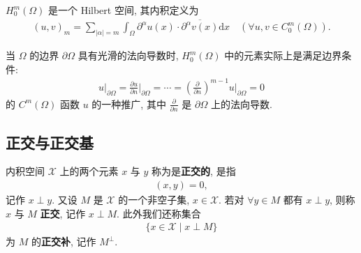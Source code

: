 \documentclass[../../main.tex]{subfiles}%
\begin{document}
\begin{proposition}
$H_0^m(\Omega)$ 是一个 Hilbert 空间, 其内积定义为
\begin{align*}
(u,v)_m=\sum\limits_{|\alpha|=m}\int_\Omega \partial^\alpha u(x)\cdot\overline{\partial^\alpha v(x)}\mathrm{d}x\quad(\forall u,v\in C_0^m(\Omega)).
\end{align*}
\end{proposition}
\begin{remark}
当 $\Omega$ 的边界 $\partial\Omega$ 具有光滑的法向导数时, $H_0^m(\Omega)$ 中的元素实际上是满足边界条件:
\begin{align*}
u|_{\partial\Omega}=\frac{\partial u}{\partial n}\bigg|_{\partial\Omega}=\cdots=\left(\frac{\partial}{\partial n}\right)^{m-1}u\bigg|_{\partial\Omega}=0
\end{align*}
的 $C^m(\Omega)$ 函数 $u$ 的一种推广, 其中 $\frac{\partial}{\partial n}$ 是 $\partial\Omega$ 上的法向导数.
\end{remark}


\subsection{正交与正交基}

\begin{definition}
内积空间 $\mathscr{X}$ 上的两个元素 $x$ 与 $y$ 称为是\textbf{正交的}, 是指
\begin{align*}
(x,y)=0,
\end{align*}
记作 $x\perp y$. 又设 $M$ 是 $\mathscr{X}$ 的一个非空子集, $x\in\mathscr{X}$. 若对 $\forall y\in M$ 都有 $x\perp y$, 则称 $x$ 与 $M$ \textbf{正交}, 记作 $x\perp M$. 此外我们还称集合
\begin{align*}
\{x\in\mathscr{X}\mid x\perp M\}
\end{align*}
为 $M$ 的\textbf{正交补}, 记作 $M^\perp$.
\end{definition}
\end{document}
